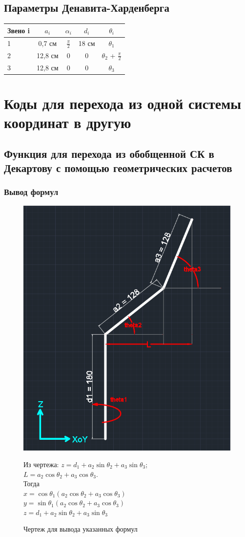 \documentclass{article}
\begin{document}
\subsection*{Параметры Денавита-Харденберга}
\begin{tabular}{|l||c|c|c|c|}
\hline
Звено i & $a_i$ & $\alpha_i$ & $d_i$ & $\theta_i$\\
\hline
\hline
1 & 0,7 см & $\frac{\pi}2$ & 18 см & $\theta_1$  \\ \hline
2 & 12,8 см & 0 & 0 & $\theta_2$ + $\frac{\pi}2$ \\ \hline
3 & 12,8 см & 0 & 0 & $\theta_3$\\
\hline
\end{tabular}

\section{Коды для перехода из одной системы координат в другую}
\subsection{Функция для перехода из обобщенной СК в Декартову с помощью геометрических расчетов}
\subsubsection*{Вывод формул}
\begin{figure}[h!]
\begin{minipage}{.55\textwidth}
\centering
\includegraphics[width=150 pt]{str_formulas.png}
\caption{Чертеж для вывода указанных формул}
\end{minipage}
\begin{minipage}{.55\textwidth}
\centering
Из чертежа: 
$z = d_1 + a_2\sin{\theta_2} + a_3\sin{\theta_3}$; \\
$L = a_2\cos{\theta_2} + a_3\cos{\theta_3}$.\\
Тогда \\
$x = \cos{\theta_1}(a_2\cos{\theta_2} + a_3\cos{\theta_3})$ \\
$y = \sin{\theta_1}(a_2\cos{\theta_2} + a_3\cos{\theta_3})$ \\
$z = d_1 + a_2\sin{\theta_2} + a_3\sin{\theta_3}$
\end{minipage}
\end{figure}
\FloatBarrier
\end{document}
